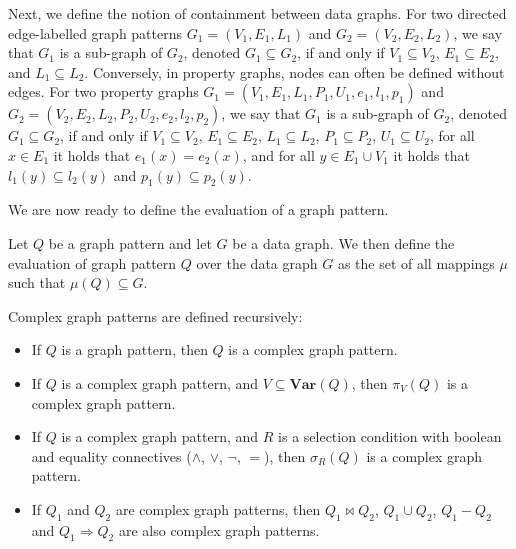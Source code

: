 Next, we define the notion of containment between data graphs. For two directed edge-labelled graph patterns $G_1 = (V_1, E_1, L_1)$ and $G_2 = (V_2, E_2, L_2)$, we say that $G_1$ is a sub-graph of $G_2$, denoted $G_1 \subseteq G_2$, if and only if $V_1 \subseteq V_2$, $E_1 \subseteq E_2$, and $L_1 \subseteq L_2$. Conversely, in property graphs, nodes can often be defined without edges. For two property graphs $G_1 = (V_1, E_1, L_1, P_1, U_1, e_1, l_1, p_1)$ and $G_2 = (V_2, E_2, L_2, P_2, U_2, e_2, l_2, p_2)$, we say that $G_1$ is a sub-graph of $G_2$, denoted $G_1 \subseteq G_2$, if and only if $V_1 \subseteq V_2$, $E_1 \subseteq E_2$, $L_1 \subseteq L_2$, $P_1 \subseteq P_2$, $U_1 \subseteq U_2$, for all $x \in E_1$ it holds that $e_1(x) = e_2(x)$, and for all $y \in E_1 \cup V_1$ it holds that $l_1(y) \subseteq l_2(y)$ and $p_1(y) \subseteq p_2(y)$.

We are now ready to define the evaluation of a graph pattern.

\begin{definition}\label{def:evaluation-graph-pattern}
    Let $Q$ be a graph pattern and let $G$ be a data graph. We then define the evaluation of graph pattern $Q$ over the data graph $G$ as the set of all mappings $\mu$ such that $\mu(Q) \subseteq G$.
\end{definition}

\begin{definition}\label{def:complex-graph-pattern}
    Complex graph patterns are defined recursively:
    \begin{itemize}
        \item If $Q$ is a graph pattern, then $Q$ is a complex graph pattern.
        \item If $Q$ is a complex graph pattern, and $V \subseteq \textbf{Var}(Q)$, then $\pi_V(Q)$ is a complex graph pattern.
        \item If $Q$ is a complex graph pattern, and $R$ is a selection condition with boolean and equality connectives ($\land$, $\lor$, $\neg$, $=$), then $\sigma_R(Q)$ is a complex graph pattern.
        \item If $Q_1$ and $Q_2$ are complex graph patterns, then $Q_1 \Join Q_2$, $Q_1 \cup Q_2$, $Q_1 - Q_2$ and $Q_1 \Rightarrow Q_2$ are also complex graph patterns.
    \end{itemize}
\end{definition}

